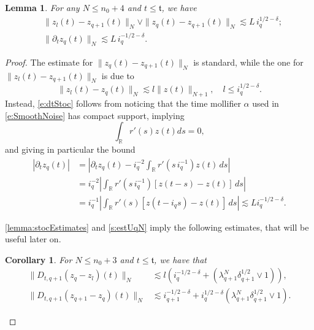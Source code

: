 \documentclass[10pt,a4paper]{amsart}
\numberwithin{equation}{section}
\newtheorem{corollario}{Corollary}
\numberwithin{corollario}{section}
\newtheorem{lemma}{Lemma}
\numberwithin{lemma}{section}
\numberwithin{prop}{section}
\theoremstyle{definition}
\theoremstyle{remark}
\newcommand{\R}{\mathbb{R}}
\newcommand{\qq}{_{q+1}}
\begin{document}
\begin{lemma}\label{lemma:stocEstimates}
    For any $N\le n_0+4$ and $t \le\mathfrak{t}$, we have
    \begin{align}
        &\label{e:Diffstoc}\|z_l(t)-z\qq(t)\|_N\vee\|z_q(t)-z\qq(t)\|_N\lesssim L\,i_q^{1/2-\delta};\\
        &\label{e:dtStoc}\|\partial_tz_q(t)\|_N\lesssim L \,i_q^{-1/2-\delta}.
    \end{align}
\end{lemma}
\begin{proof}
    The estimate for $\|z_q(t)-z\qq(t)\|_N$ is standard, while the one for $\|z_l(t)-z\qq(t)\|_N$ is due to 
    \[\|z_l(t)-z_q(t)\|_N\lesssim l\|z(t)\|_{N+1},\quad 
    l\le i_q^{1/2-\delta}.\]
    Instead, \eqref{e:dtStoc} follows from noticing that the time mollifier $\alpha$ used in \eqref{e:SmoothNoise} has compact support, implying 
    \[\int_{\R}r'(s)z(t)ds=0,\]
and giving in particular the bound
    \begin{align}
    |\partial_tz_q(t)|
    &=
        \left|\partial_tz_q(t)-i_q^{-2}\int_{\R}r'(s\,i_q^{-1})z(t)\,ds\right|
    \\
    &=i_q^{-2}\left|\int_{\R}r'(s\,i_q^{-1})[z(t-s)-z(t)]\,ds\right|
     \\
    &=i_q^{-1}\left|\int_{\R}r'(s)[z(t-i_qs)-z(t)]\,ds\right| \lesssim Li_q^{-1/2-\delta}.
    \end{align}

\autoref{lemma:stocEstimates} and \eqref{s:estUqN} imply the following estimates, that will be useful later on.
\begin{corollario}\label{cor:Dtq1Z}
    For $N\le n_0+3$ and $t\le \mathfrak{t}$, we have that
    \begin{align}
        \label{est:Dtq1ZMoll}\|D_{t,q+1}(z_q-z_l)(t)\|_N
        &\lesssim
        l\left(i_q^{-1/2-\delta}+(\lambda\qq^N\delta\qq^{1/2}\vee 1)\right),\\
        \label{est:Dtq1ZVar}\|D_{t,q+1}(z\qq-z_q)(t)\|_N
        &\lesssim 
        i\qq^{-1/2-\delta}+i_q^{1/2-\delta}(\lambda\qq^N\delta\qq^{1/2}\vee 1).
    \end{align}
\end{corollario}


\end{proof}
\end{document}
